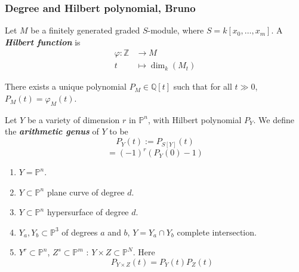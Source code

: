 \subsubsection{Degree and Hilbert polynomial, Bruno}


\begin{defn}
	Let $M$ be a finitely generated graded $S$-module, where $S=k[x_0,\ldots,x_m]$. A \textit{\textbf{Hilbert function}} is
	\begin{align*}
		\varphi: \mathbb{Z} &\longrightarrow M \\
		t &\longmapsto \dim_k(M_t)
	\end{align*}
\end{defn}

\begin{thm}
	There exists a unique polynomial $P_M\in\mathbb{Q}[t]$ such that for all $t\gg 0$, $P_M(t)=\varphi_M(t)$.
\end{thm}

\begin{manualexercise}{7.2}
	Let $Y$ be a variety of dimension $r$ in $\mathbb{P}^n$, with Hilbert polynomial $P_Y$. We define the \textit{\textbf{arithmetic genus}} of $Y$ to be
	\[P_Y(t):=P_{S[Y]}(t)\]
	\[=(-1)^r(P_Y(0)-1)\]
	\begin{enumerate}[label=\alph*.]
		\item  $Y=\mathbb{P}^n$.
		\item $Y\subset \mathbb{P}^n$ plane curve of degree $d$.
		\item $ Y\subset \mathbb{P}^n$ hypersurface of degree $d$.
		\item $Y_a,Y_b\subset \mathbb{P}^3$ of degrees $a$ and $b$, $Y =Y_a\cap Y_b$ complete intersection.
		\item $Y^r\subset \mathbb{P}^n$, $Z^s\subset \mathbb{P}^m$ : $Y\times Z\subset \mathbb{P}^N$. Here
			\[P_{Y\times Z}(t)=P_Y(t)P_Z(t)\]
	\end{enumerate}
\end{manualexercise}

